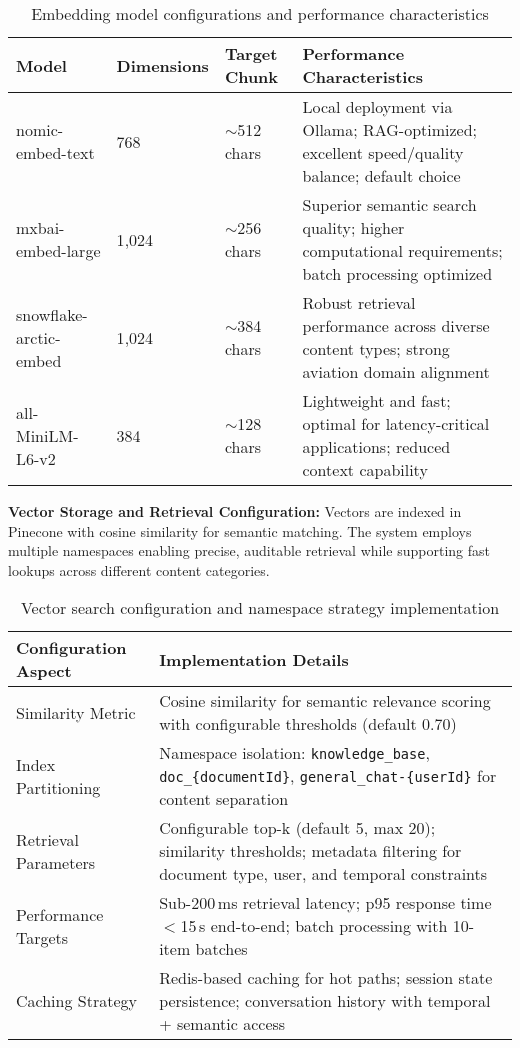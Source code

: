 \begin{table}[H]
\centering
\caption{Embedding model configurations and performance characteristics}
\label{tab:emb_models_s2}
\begin{tabular}{|p{4cm}|p{2.5cm}|p{3cm}|p{5.5cm}|}
\hline
\textbf{Model} & \textbf{Dimensions} & \textbf{Target Chunk} & \textbf{Performance Characteristics} \\
\hline
nomic-embed-text & 768 & $\sim$512 chars & Local deployment via Ollama; RAG-optimized; excellent speed/quality balance; default choice \\
\hline
mxbai-embed-large & 1{,}024 & $\sim$256 chars & Superior semantic search quality; higher computational requirements; batch processing optimized \\
\hline
snowflake-arctic-embed & 1{,}024 & $\sim$384 chars & Robust retrieval performance across diverse content types; strong aviation domain alignment \\
\hline
all-MiniLM-L6-v2 & 384 & $\sim$128 chars & Lightweight and fast; optimal for latency-critical applications; reduced context capability \\
\hline
\end{tabular}
\end{table}

\textbf{Vector Storage and Retrieval Configuration:}
Vectors are indexed in Pinecone with cosine similarity for semantic matching. The system employs multiple namespaces enabling precise, auditable retrieval while supporting fast lookups across different content categories.

\begin{table}[H]
\centering
\caption{Vector search configuration and namespace strategy implementation}
\label{tab:vector_config_s2}
\begin{tabular}{|p{4cm}|p{10cm}|}
\hline
\textbf{Configuration Aspect} & \textbf{Implementation Details} \\
\hline
Similarity Metric & Cosine similarity for semantic relevance scoring with configurable thresholds (default 0.70) \\
\hline
Index Partitioning & Namespace isolation: \texttt{knowledge\_base}, \texttt{doc\_\{documentId\}}, \texttt{general\_chat-\{userId\}} for content separation \\
\hline
Retrieval Parameters & Configurable top-k (default 5, max 20); similarity thresholds; metadata filtering for document type, user, and temporal constraints \\
\hline
Performance Targets & Sub-200\,ms retrieval latency; p95 response time $<$15\,s end-to-end; batch processing with 10-item batches \\
\hline
Caching Strategy & Redis-based caching for hot paths; session state persistence; conversation history with temporal + semantic access \\
\hline
\end{tabular}
\end{table}

